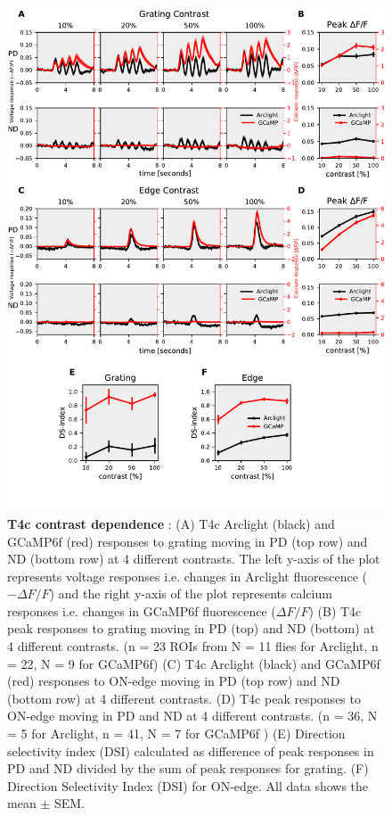 \documentclass[9pt,lineno]{elife}
\begin{document}
\begin{figure}
\begin{fullwidth}
\includegraphics[width=0.84\linewidth]{figure2}
\caption{\textbf{T4c contrast dependence} : (A) T4c Arclight (black) and GCaMP6f (red) responses to grating moving in PD (top row) and ND (bottom row) at 4 different contrasts. The left y-axis of the plot represents voltage responses i.e. changes in Arclight fluorescence ($-\Delta F/F$) and the right y-axis of the plot represents calcium responses i.e. changes in GCaMP6f fluorescence ($\Delta F/F$) (B) T4c peak responses to grating moving in PD (top) and ND (bottom) at 4 different contrasts. (n = 23 ROIs from N = 11 flies for Arclight, n = 22, N = 9 for GCaMP6f) (C) T4c Arclight (black) and GCaMP6f (red) responses to ON-edge moving in PD (top row) and ND (bottom row) at 4 different contrasts. (D) T4c peak responses to ON-edge moving in PD and ND at 4 different contrasts. (n = 36, N = 5 for Arclight, n = 41, N = 7 for GCaMP6f ) (E) Direction selectivity index (DSI) calculated as difference of peak responses in PD and ND divided by the sum of peak responses for grating. (F) Direction Selectivity Index (DSI) for ON-edge. All data shows the mean $\pm$ SEM.}

\label{PDNDcontrast}
	
\end{fullwidth}
\end{figure} 
\end{document}
